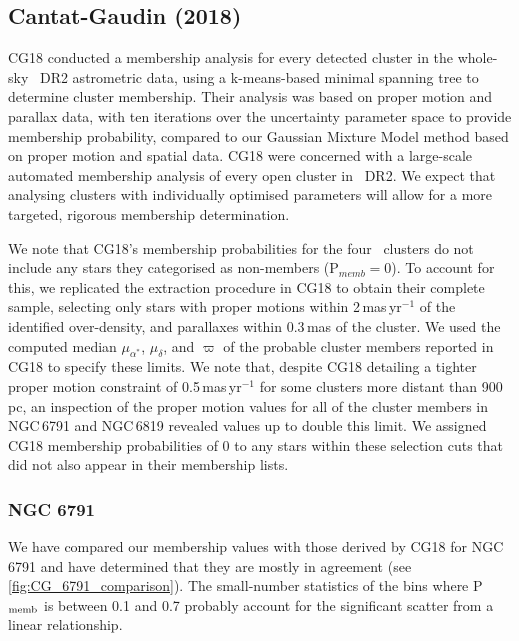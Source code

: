 \subsection{Cantat-Gaudin (2018)}

CG18 conducted a membership analysis for every detected cluster in the whole-sky \Gaia~DR2 astrometric data, using a k-means-based minimal spanning tree to determine cluster membership. Their analysis was based on proper motion and parallax data, with ten iterations over the uncertainty parameter space to provide membership probability, compared to our Gaussian Mixture Model method based on proper motion and spatial data. CG18 were concerned with a large-scale automated membership analysis of every open cluster in \Gaia~DR2. We expect that analysing clusters with individually optimised parameters will allow for a more targeted, rigorous membership determination.

We note that CG18's membership probabilities for the four \Kepler~clusters do not include any stars they categorised as non-members (P$_{memb} = 0$). To account for this, we replicated the extraction procedure in CG18 to obtain their complete sample, selecting only stars with proper motions within 2\,mas\,yr$^{-1}$ of the identified over-density, and parallaxes within 0.3\,mas of the cluster. We used the computed median $\mu_{\alpha^{*}}$, $\mu_{\delta}$, and $\varpi$ of the probable cluster members reported in CG18 to specify these limits. We note that, despite CG18 detailing a tighter proper motion constraint of 0.5\,mas\,yr$^{-1}$ for some clusters more distant than 900\,pc, an inspection of the proper motion values for all of the cluster members in NGC\,6791 and NGC\,6819 revealed values up to double this limit. We assigned CG18 membership probabilities of 0 to any stars within these selection cuts that did not also appear in their membership lists.

\subsubsection{NGC 6791}

We have compared our membership values with those derived by CG18 for NGC\,6791 and have determined that they are mostly in agreement (see \cref{fig:CG_6791_comparison}). The small-number statistics of the bins where P$_{\rm memb}$ is between 0.1 and 0.7 probably account for the significant scatter from a linear relationship.

